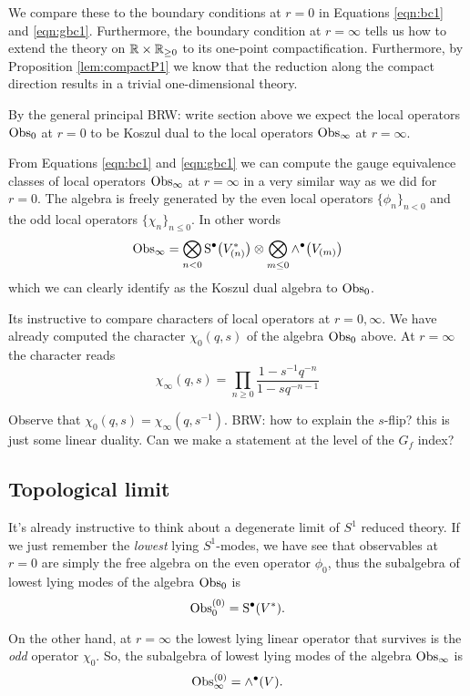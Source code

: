 \documentclass[11pt]{amsart}
\def\brian#1{{\textcolor{blue!65!red}{BRW: {#1}}}}
\begin{document}
We compare these to the boundary conditions at $r=0$ in Equations \eqref{eqn:bc1} and \eqref{eqn:gbc1}. 
Furthermore, the boundary condition at $r = \infty$ tells us how to extend the theory on $\mathbb R \times \mathbb R_{\geq 0}$ to its one-point compactification. 
Furthermore, by Proposition \ref{lem:compactP1} we know that the reduction along the compact direction results in a trivial one-dimensional theory.

By the general principal \brian{write section above} we expect the local operators ${\rm Obs}_0$ at $r = 0$ to be Koszul dual to the local operators ${\rm Obs}_\infty$ at $r = \infty$. 

From Equations \eqref{eqn:bc1} and \eqref{eqn:gbc1} we can compute the gauge equivalence classes of local operators ${\rm Obs}_\infty$ at $r = \infty$ in a very similar way as we did for $r = 0$. 
The algebra is freely generated by the even local operators $\{\phi_n\}_{n < 0}$ and the odd local operators $\{\chi_n\}_{n \leq 0}$. 
In other words
\[
{\rm Obs}_\infty = \bigotimes_{n < 0} {\rm S}^\bullet \big(V^*_{(n)}\big) \otimes \bigotimes_{m \leq 0} \wedge^\bullet \big(V_{(m)}\big)
\]
which we can clearly identify as the Koszul dual algebra to ${\rm Obs}_0$. 

Its instructive to compare characters of local operators at $r = 0, \infty$. 
We have already computed the character $\chi_0(q,s)$ of the algebra ${\rm Obs}_0$ above. 
At $r=\infty$ the character reads 
\[
\chi_\infty (q,s) = \prod_{n \geq 0} \frac{1 - s^{-1}q^{-n}}{1 - s q^{-n-1}}
\]

Observe that $\chi_0 (q,s) = \chi_\infty (q, s^{-1})$. 
\brian{how to explain the $s$-flip? this is just some linear duality. Can we make a statement at the level of the $G_f$ index?}

\subsection*{Topological limit}

It's already instructive to think about a degenerate limit of $S^1$ reduced theory. 
If we just remember the {\em lowest} lying $S^1$-modes, we have see that observables at $r=0$ are simply the free algebra on the even operator $\phi_0$, thus the subalgebra of lowest lying modes of the algebra ${\rm Obs}_0$ is
\[
{\rm Obs}_0^{(0)} = {\rm S}^\bullet(V^*).
\]

On the other hand, at $r=\infty$ the lowest lying linear operator that survives is the {\em odd} operator $\chi_0$.
So, the subalgebra of lowest lying modes of the algebra ${\rm Obs}_\infty$ is
\[
{\rm Obs}_\infty^{(0)} = \wedge^\bullet(V) .
\]
\end{document}
